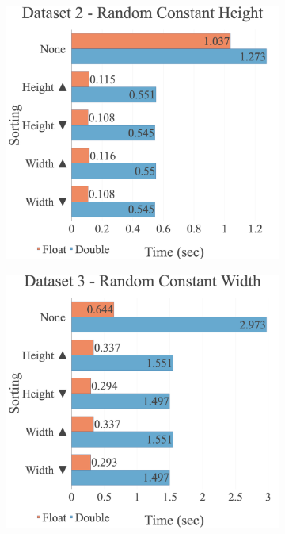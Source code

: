 \begin{figure}[H]
\begin{adjustwidth}{-2cm}{-2cm}
\begin{subfigure}{.62\textwidth}
\end{subfigure}
\par\bigskip
\par\bigskip
\begin{subfigure}{.62\textwidth}
  \centering
  \includegraphics[width=1\textwidth]{img/experiments/option-sorts-2_RANDCONSTHEIGHT.png}
\end{subfigure}
\begin{subfigure}{.62\textwidth}
  \centering
  \includegraphics[width=1\textwidth]{img/experiments/option-sorts-3_RANDCONSTWIDTH.png}
\end{subfigure}
\end{adjustwidth}
\end{figure}

